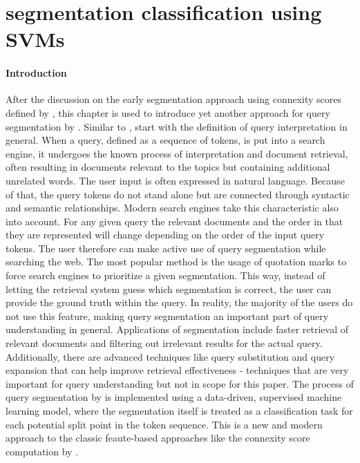 \section{segmentation classification using SVMs} \label{approach2}

\paragraph*{Introduction}
After the discussion on the early segmentation approach using connexity scores defined by \citeauthor{Risvik:2003}, this chapter is used to introduce yet another approach for query segmentation by \citeauthor{Bergsma:2007}. Similar to \citeauthor{Risvik:2003}, \citeauthor{Bergsma:2007} start with the definition of query interpretation in general. When a query, defined as a sequence of tokens, is put into a search engine, it undergoes the known process of interpretation and document retrieval, often resulting in documents relevant to the topics but containing additional unrelated words. The user input is often expressed in natural language. Because of that, the query tokens do not stand alone but are connected through syntactic and semantic relationships. Modern search engines take this characteristic also into account. For any given query the relevant documents and the order in that they are represented will change depending on the order of the input query tokens. The user therefore can make active use of query segmentation while searching the web. The most popular method is the usage of quotation marks to force search engines to prioritize a given segmentation. This way, instead of letting the retrieval system guess which segmentation is correct, the user can provide the ground truth within the query. In reality, the majority of the users do not use this feature, making query segmentation an important part of query understanding in general. Applications of segmentation include faster retrieval of relevant documents and filtering out irrelevant results for the actual query. Additionally, there are advanced techniques like query substitution and query expansion that can help improve retrieval effectiveness - techniques that are very important for query understanding but not in scope for this paper. The process of query segmentation by \citeauthor{Bergsma:2007} is implemented using a data-driven, supervised machine learning model, where the segmentation itself is treated as a classification task for each potential split point in the token sequence. This is a new and modern approach to the classic feaute-based approaches like the connexity score computation by \citet{Risvik:2003}.

